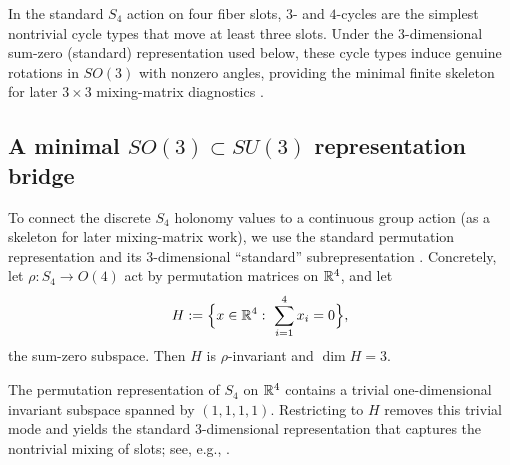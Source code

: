\begin{remark}\label{rem:why_34_cycles}
In the standard $S_4$ action on four fiber slots, $3$- and $4$-cycles are the simplest nontrivial cycle types that move at least three slots.
Under the $3$-dimensional sum-zero (standard) representation used below, these cycle types induce genuine rotations in $SO(3)$ with nonzero angles, providing the minimal finite skeleton for later $3\times 3$ mixing-matrix diagnostics \cite{Serre1977}.
\end{remark}

\subsection{A minimal \texorpdfstring{$SO(3)\subset SU(3)$}{SO(3) subset SU(3)} representation bridge}
\label{subsec:holonomy_su3_bridge}

To connect the discrete $S_4$ holonomy values to a continuous group action (as a skeleton for later mixing-matrix work), we use the standard permutation representation and its $3$-dimensional ``standard'' subrepresentation \cite{Serre1977}.
Concretely, let $\rho:S_4\to O(4)$ act by permutation matrices on $\mathbb{R}^4$, and let
\[
H:=\Bigl\{x\in\mathbb{R}^4:\ \sum_{i=1}^4 x_i=0\Bigr\},
\]
the sum-zero subspace. Then $H$ is $\rho$-invariant and $\dim H=3$.
\begin{remark}\label{rem:sum_zero_canonical}
The permutation representation of $S_4$ on $\mathbb{R}^4$ contains a trivial one-dimensional invariant subspace spanned by $(1,1,1,1)$.
Restricting to $H$ removes this trivial mode and yields the standard $3$-dimensional representation that captures the nontrivial mixing of slots; see, e.g., \cite{Serre1977}.
\end{remark}

